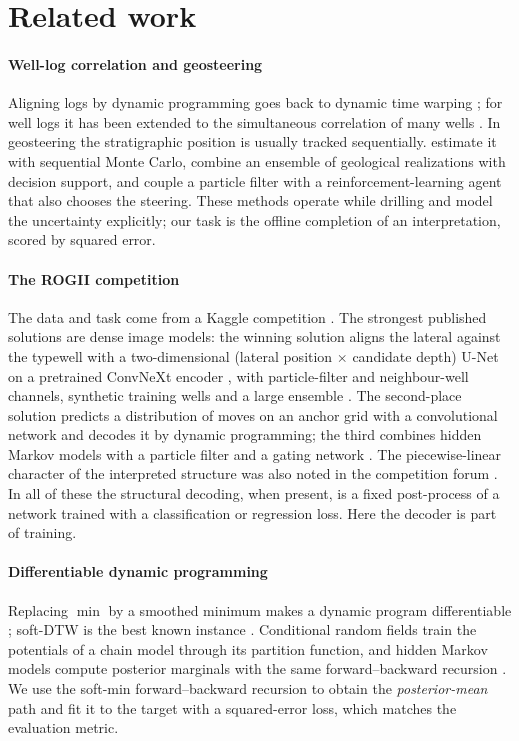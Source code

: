 \documentclass[preprint,12pt,authoryear]{elsarticle}
\begin{document}
\section{Related work}\label{sec:related}
\paragraph{Well-log correlation and geosteering}
Aligning logs by dynamic programming goes back to dynamic time warping \citep{sakoe1978}; for well logs it has been extended to the simultaneous correlation of many wells \citep{wheeler2015}. In geosteering the stratigraphic position is usually tracked sequentially. \citet{veettil2020} estimate it with sequential Monte Carlo, \citet{alyaev2019} combine an ensemble of geological realizations with decision support, and \citet{muhammad2025} couple a particle filter with a reinforcement-learning agent that also chooses the steering. These methods operate while drilling and model the uncertainty explicitly; our task is the offline completion of an interpretation, scored by squared error.

\paragraph{The ROGII competition}
The data and task come from a Kaggle competition \citep{rogii2026}. The strongest published solutions are dense image models: the winning solution aligns the lateral against the typewell with a two-dimensional (lateral position $\times$ candidate depth) U-Net \citep{ronneberger2015unet} on a pretrained ConvNeXt encoder \citep{liu2022convnext}, with particle-filter and neighbour-well channels, synthetic training wells and a large ensemble \citep{rogii1st}. The second-place solution predicts a distribution of moves on an anchor grid with a convolutional network and decodes it by dynamic programming; the third combines hidden Markov models with a particle filter and a gating network \citep{rogiiforum}. The piecewise-linear character of the interpreted structure was also noted in the competition forum \citep{rogiiforum}. In all of these the structural decoding, when present, is a fixed post-process of a network trained with a classification or regression loss. Here the decoder is part of training.

\paragraph{Differentiable dynamic programming}
Replacing $\min$ by a smoothed minimum makes a dynamic program differentiable \citep{mensch2018diffdp}; soft-DTW is the best known instance \citep{cuturi2017softdtw}. Conditional random fields \citep{lafferty2001crf} train the potentials of a chain model through its partition function, and hidden Markov models compute posterior marginals with the same forward--backward recursion \citep{rabiner1989}. We use the soft-min forward--backward recursion to obtain the \emph{posterior-mean} path and fit it to the target with a squared-error loss, which matches the evaluation metric.
\end{document}
